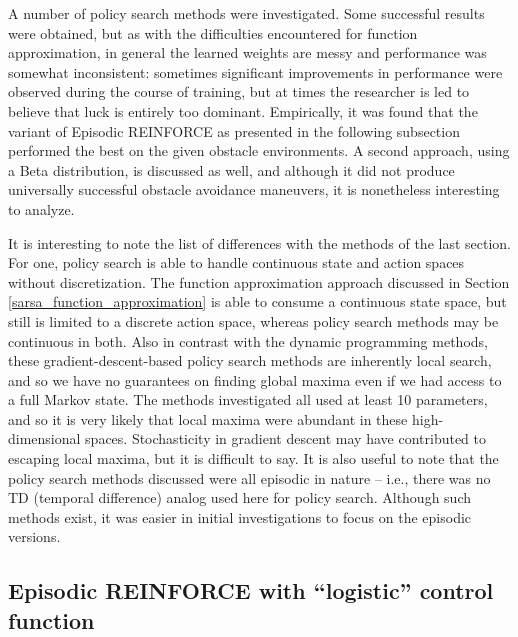 \documentclass{article}
\begin{document}
A number of policy search methods were investigated.  Some successful results were obtained, but as with the difficulties encountered for function approximation, in general the learned weights are messy and performance was somewhat inconsistent: sometimes significant improvements in performance were observed during the course of training, but at times the researcher is led to believe that luck is entirely too dominant.  Empirically, it was found that the variant of Episodic REINFORCE as presented in the following subsection performed the best on the given obstacle environments.  A second approach, using a Beta distribution, is discussed as well, and although it did not produce universally successful obstacle avoidance maneuvers, it is nonetheless interesting to analyze.

It is interesting to note the list of differences with the methods of the last section.  For one, policy search is able to handle continuous state and action spaces without discretization.  The function approximation approach discussed in Section \ref{sarsa_function_approximation} is able to consume a continuous state space, but still is limited to a discrete action space, whereas policy search methods may be continuous in both.  Also in contrast with the dynamic programming methods, these gradient-descent-based policy search methods are inherently local search, and so we have no guarantees on finding global maxima even if we had access to a full Markov state.  The methods investigated all used at least 10 parameters, and so it is very likely that local maxima were abundant in these high-dimensional spaces.  Stochasticity in gradient descent may have contributed to escaping local maxima, but it is difficult to say.  It is also useful to note that the policy search methods discussed were all episodic in nature -- i.e., there was no TD (temporal difference) analog used here for policy search.  Although such methods exist, it was easier in initial investigations to focus on the episodic versions.

\subsection{Episodic REINFORCE with ``logistic'' control function}
\end{document}
